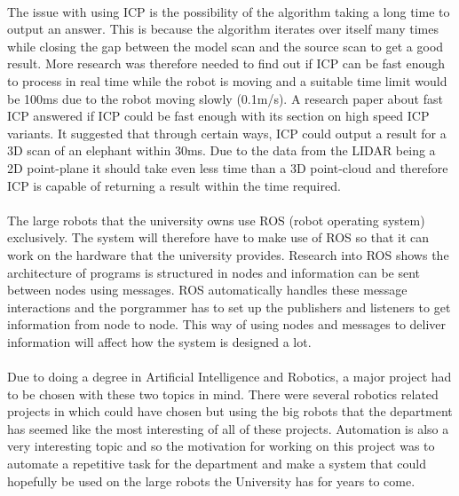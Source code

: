 \paragraph{}
The issue with using ICP is the possibility of the algorithm taking a long time to output an answer. This is because the algorithm iterates over itself many times while closing the gap between the model scan and the source scan to get a good result. More research was therefore needed to find out if ICP can be fast enough to process in real time while the robot is moving and a suitable time limit would be 100ms due to the robot moving slowly (0.1m/s). A research paper about fast ICP\cite{Levoy} answered if ICP could be fast enough with its section on high speed ICP variants. It suggested that through certain ways, ICP could output a result for a 3D scan of an elephant within 30ms. Due to the data from the LIDAR being a 2D point-plane it should take even less time than a 3D point-cloud and therefore ICP is capable of returning a result within the time required.
\paragraph{}
The large robots that the university owns use ROS\cite{ROS} (robot operating system) exclusively. The system will therefore have to make use of ROS so that it can work on the hardware that the university provides. Research into ROS shows the architecture of programs is structured in nodes and information can be sent between nodes using messages. ROS automatically handles these message interactions and the porgrammer has to set up the publishers and listeners to get information from node to node. This way of using nodes and messages to deliver information will affect how the system is designed a lot.
\paragraph{}
Due to doing a degree in Artificial Intelligence and Robotics, a major project had to be chosen with these two topics in mind. There were several robotics related projects in which could have chosen but using the big robots that the department has seemed like the most interesting of all of these projects.  Automation is also a very interesting topic and so the motivation for working on this project was to automate a repetitive task for the department and make a system that could hopefully be used on the large robots the University has for years to come.


